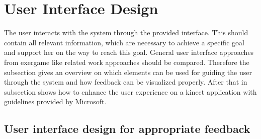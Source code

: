 \section{User Interface Design}
The user interacts with the system through the provided interface. This should contain all relevant information, which are necessary to achieve a specific goal and support her on the way to reach this goal. General user interface approaches from exergame like related work approaches should be compared. Therefore the subsection \textit{} gives an overview on which elements can be used for guiding the user through the system and how feedback can be visualized properly. After that in subsection \textit{} shows how to enhance the user experience on a kinect application with guidelines provided by Microsoft.

\subsection{User interface design for appropriate feedback}\label{2_5_1_userInterfacefeedback}

